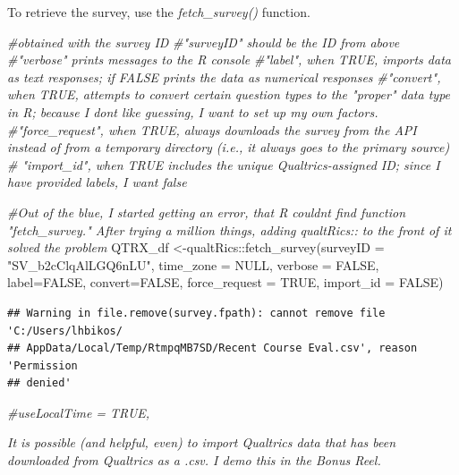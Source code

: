 \documentclass[
]{book}
\newenvironment{Shaded}{\begin{snugshade}}{\end{snugshade}}
\newcommand{\AttributeTok}[1]{\textcolor[rgb]{0.77,0.63,0.00}{#1}}
\newcommand{\CommentTok}[1]{\textcolor[rgb]{0.56,0.35,0.01}{\textit{#1}}}
\newcommand{\ConstantTok}[1]{\textcolor[rgb]{0.00,0.00,0.00}{#1}}
\newcommand{\FunctionTok}[1]{\textcolor[rgb]{0.00,0.00,0.00}{#1}}
\newcommand{\NormalTok}[1]{#1}
\newcommand{\OtherTok}[1]{\textcolor[rgb]{0.56,0.35,0.01}{#1}}
\newcommand{\SpecialCharTok}[1]{\textcolor[rgb]{0.00,0.00,0.00}{#1}}
\newcommand{\StringTok}[1]{\textcolor[rgb]{0.31,0.60,0.02}{#1}}
\begin{document}
To retrieve the survey, use the \emph{fetch\_survey()} function.

\begin{Shaded}
\begin{Highlighting}[]
\CommentTok{\#obtained with the survey ID }
\CommentTok{\#"surveyID" should be the ID from above}
\CommentTok{\#"verbose" prints messages to the R console}
\CommentTok{\#"label", when TRUE, imports data as text responses; if FALSE prints the data as numerical responses}
\CommentTok{\#"convert", when TRUE, attempts to convert certain question types to the "proper" data type in R; because I don\textquotesingle{}t like guessing, I want to set up my own factors.}
\CommentTok{\#"force\_request", when TRUE, always downloads the survey from the API instead of from a temporary directory (i.e., it always goes to the primary source)}
\CommentTok{\# "import\_id", when TRUE includes the unique Qualtrics{-}assigned ID; since I have provided labels, I want false}

\CommentTok{\#Out of the blue, I started getting an error, that R couldn\textquotesingle{}t find function "fetch\_survey."  After trying a million things, adding qualtRics:: to the front of it solved the problem}
\NormalTok{QTRX\_df }\OtherTok{\textless{}{-}}\NormalTok{qualtRics}\SpecialCharTok{::}\FunctionTok{fetch\_survey}\NormalTok{(}\AttributeTok{surveyID =} \StringTok{"SV\_b2cClqAlLGQ6nLU"}\NormalTok{, }\AttributeTok{time\_zone =} \ConstantTok{NULL}\NormalTok{, }\AttributeTok{verbose =} \ConstantTok{FALSE}\NormalTok{, }\AttributeTok{label=}\ConstantTok{FALSE}\NormalTok{, }\AttributeTok{convert=}\ConstantTok{FALSE}\NormalTok{, }\AttributeTok{force\_request =} \ConstantTok{TRUE}\NormalTok{, }\AttributeTok{import\_id =} \ConstantTok{FALSE}\NormalTok{)}
\end{Highlighting}
\end{Shaded}

\begin{verbatim}
## Warning in file.remove(survey.fpath): cannot remove file 'C:/Users/lhbikos/
## AppData/Local/Temp/RtmpqMB7SD/Recent Course Eval.csv', reason 'Permission
## denied'
\end{verbatim}

\begin{Shaded}
\begin{Highlighting}[]
\CommentTok{\#useLocalTime = TRUE,}
\end{Highlighting}
\end{Shaded}

\emph{It is possible (and helpful, even) to import Qualtrics data that has been downloaded from Qualtrics as a .csv. I demo this in the Bonus Reel.}
\end{document}

